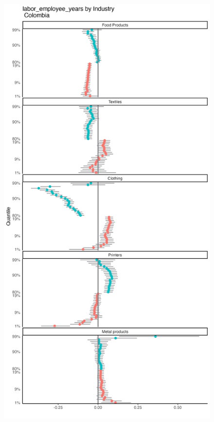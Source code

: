 \documentclass[
  12pt]{article}
\theoremstyle{definition}
\theoremstyle{remark}
\begin{document}
\begin{figure}

{\centering \includegraphics[width=\textwidth,height=1\textheight]{../Results/Figures/Colombia/labor_employee_years_by_inds_diff.png}

}

\end{figure}
\end{document}
